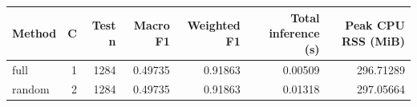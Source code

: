\begin{tabular}{lrrrrrr}
\toprule
Method & C & Test n & Macro F1 & Weighted F1 & Total inference (s) & Peak CPU RSS (MiB) \\
\midrule
full & 1 & 1284 & 0.49735 & 0.91863 & 0.00509 & 296.71289 \\
random & 2 & 1284 & 0.49735 & 0.91863 & 0.01318 & 297.05664 \\
\bottomrule
\end{tabular}
